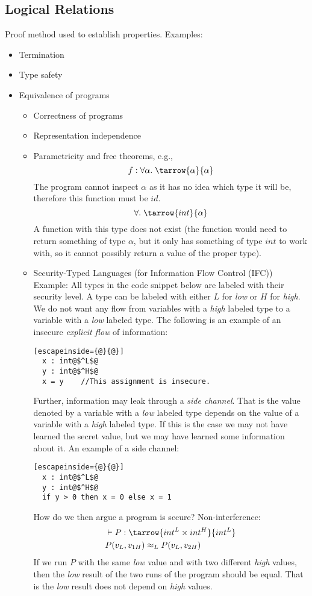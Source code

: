 \subsection*{Logical Relations}
Proof method used to establish properties. Examples:
\begin{itemize}
\item Termination
\item Type safety
\item Equivalence of programs
  \begin{itemize}
  \item Correctness of programs
  \item Representation independence
  \item Parametricity and free theorems, e.g.,
    \[
    f: \forall \alpha. \; \tarrow{\alpha}{\alpha}
    \]
    The program cannot inspect $\alpha$ as it has no idea which type it will be, therefore this function must be $id$.
    \[
    \forall. \; \tarrow{int}{\alpha}
    \]
    A function with this type does not exist (the function would need to return something of type $\alpha$, but it only has something of type $int$ to work with, so it cannot possibly return a value of the proper type).
  \item Security-Typed Languages (for Information Flow Control (IFC))\\
        Example: All types in the code snippet below are labeled with their security level. A type can be labeled with either $L$ for \emph{low} or $H$ for \emph{high}. We do not want any flow from variables with a \emph{high} labeled type to a variable with a \emph{low} labeled type. The following is an example of an insecure \emph{explicit flow} of information:
        \begin{lstlisting}[escapeinside={@}{@}]
  x : int@$^L$@
  y : int@$^H$@
  x = y    //This assignment is insecure.
        \end{lstlisting}
Further, information may leak through a \emph{side channel}. That is the value denoted by a variable with a \emph{low} labeled type depends on the value of a variable with a \emph{high} labeled type. If this is the case we may not have learned the secret value, but we may have learned some information about it. An example of a side channel:
        \begin{lstlisting}[escapeinside={@}{@}]
  x : int@$^L$@
  y : int@$^H$@
  if y > 0 then x = 0 else x = 1
        \end{lstlisting}
How do we then argue a program is secure? Non-interference:
\begin{align*}
  & \vdash P : \tarrow{int^L \times int^H}{int^L} \\
  & P(v_L,v_{1H}) \approx_L P(v_L,v_{2H})
\end{align*}
If we run $P$ with the same \emph{low} value and with two different \emph{high} values, then the \emph{low} result of the two runs of the program should be equal. That is the \emph{low} result does not depend on \emph{high} values.
  \end{itemize}
\end{itemize}
